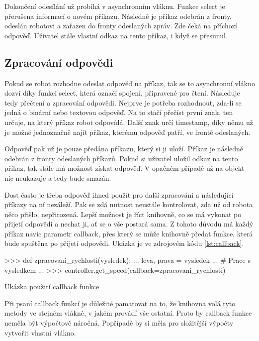     Dokončení odesílání už probíhá v asynchronním vláknu. Funkce select je
    přerušena informací o novém příkazu. Následně je příkaz odebrán z fronty,
    odeslán robotovi a zařazen do fronty odeslaných zpráv. Zde čeká na příchozí
    odpověď. Uživatel stále vlastní odkaz na tento příkaz, i když se přesunul.

    \subsection{Zpracování odpovědi}

    Pokud se robot rozhodne odeslat odpověď na příkaz, tak se to asynchronní
    vlákno dozví díky funkci select, která označí spojení, připravené pro čtení.
    Následuje tedy přečtení a zpracování odpovědi. Nejprve je potřeba
    rozhodnout, zda-li se jedná o binární nebo textovou odpověď. Na to stačí
    přečíst první znak, ten určuje, na který příkaz robot odpovídá. Další znak
    určí timestamp, díky němu už je možné jednoznačně najít příkaz, kterému
    odpověď patří, ve frontě odeslaných.

    Odpověď pak už je pouze předána příkazu, který si ji uloží. Příkaz je
    následně odebrán z fronty odeslaných příkazů. Pokud si uživatel uložil
    odkaz na tento příkaz, tak stále má možnost získat odpověď. V opačném
    případě už na objekt nic neukazuje a tedy bude smazán.

    Dost často je třeba odpověď ihned použít pro další zpracování a následující
    příkazy na ní nezáleží. Pak se zdá nutnost neustále kontrolovat, zda už od
    robota něco přišlo, nepřirozená. Lepší možnost je říct knihovně, co se má
    vykonat po přijetí odpovědi a nechat ji, ať se o vše postará sama. Z tohoto
    důvodu má každý příkaz navíc parametr callback, přes který se může knihovně
    předat funkce, která bude spuštěna po přijetí odpovědi. Ukázka je ve
    zdrojovém kódu \ref{lst:callback}.

    \begin{listing}
    \begin{pyc}
>>> def zpracovani_rychlosti(vysledek):
...    leva, prava = vysledek
...    # Prace s vysledkem
...
>>> controller.get_speed(callback=zpracovani_rychlosti)
    \end{pyc}
    \caption{Ukázka použití callback funkce}
    \label{lst:callback}
    \end{listing}

    Při psaní callback funkcí je důležité pamatovat na to, že knihovna volá
    tyto metody ve stejném vlákně, v jakém provádí vše ostatní. Proto by
    callback funkce neměla být výpočtově náročná. Popřípadě by si měla pro
    složitější výpočty vytvořit vlastní vlákno.

